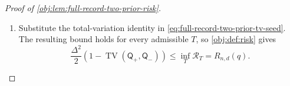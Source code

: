 \begin{proof}[Proof of \cref{obj:lem:full-record-two-prior-risk}]
\begin{enumerate}
On \(\mathcal E_T\), \(T(o,\xi)<0\) and \(\Delta>0\), so
\((T(o,\xi)-\Delta)^2\ge\Delta^2\). On its complement,
\(T(o,\xi)\ge0\), so \((T(o,\xi)+\Delta)^2\ge\Delta^2\).
Together with nonnegativity off the respective events, these give the pointwise bounds
\[
\Delta^2\mathbf1_{\mathcal E_T}(o,\xi)
\le (T(o,\xi)-\Delta)^2,
\qquad
\Delta^2\mathbf1_{\mathcal E_T^c}(o,\xi)
\le (T(o,\xi)+\Delta)^2.
\]
Integrating under the corresponding augmented laws yields
\[
\Delta^2\mathsf Q_+^{\mathrm{aug}}(\mathcal E_T)
\le\mathcal L_{\mathrm{mix},+}(T),
\qquad
\Delta^2\mathsf Q_-^{\mathrm{aug}}(\mathcal E_T^c)
\le\mathcal L_{\mathrm{mix},-}(T).
\]

Combining these bounds in order gives
\[
\begin{aligned}
\Delta^2\left(
1-\operatorname{TV}
\bigl(\mathsf Q_+^{\mathrm{aug}},\mathsf Q_-^{\mathrm{aug}}\bigr)
\right)
&\le
\Delta^2\left(
\mathsf Q_+^{\mathrm{aug}}(\mathcal E_T)
+\mathsf Q_-^{\mathrm{aug}}(\mathcal E_T^c)
\right)\\
&\le
\mathcal L_{\mathrm{mix},+}(T)
+\mathcal L_{\mathrm{mix},-}(T)\\
&\le 2\mathcal R_T.
\end{aligned}
\]
Cancelling the positive finite factor \(2\), which is valid also for extended nonnegative risks, proves
\[
\frac{\Delta^2}{2}\left(
1-\operatorname{TV}
\bigl(\mathsf Q_+^{\mathrm{aug}},\mathsf Q_-^{\mathrm{aug}}\bigr)
\right)
\le\mathcal R_T.
\]

\item Substitute the total-variation identity in \cref{eq:full-record-two-prior-tv-seed}. The resulting bound holds for every admissible \(T\), so \cref{obj:def:risk} gives
\[
\frac{\Delta^2}{2}
\left(1-\operatorname{TV}(\mathsf Q_+,\mathsf Q_-)\right)
\le
\inf_T\mathcal R_T
=
R_{n,d}(q).
\]
\end{enumerate}
\end{proof}
